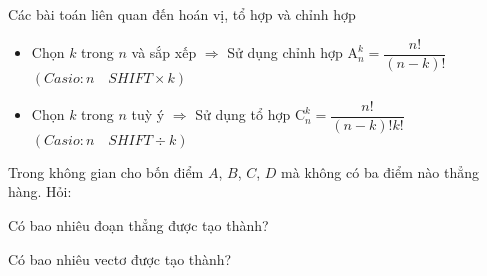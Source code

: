 \begin{dang}{Các bài toán liên quan đến hoán vị, tổ hợp và chỉnh hợp}
	\begin{itemize}
		\item Chọn $k$ trong $n$ và sắp xếp $\Rightarrow$ Sử dụng chỉnh hợp $\mathrm{A}_n^k=\dfrac{n!}{(n-k)!}$\\ $\left(Casio: n \quad SHIFT \times k\right)$
		\item Chọn $k$ trong $n$ tuỳ ý $\Rightarrow$ Sử dụng tổ hợp $\mathrm{C}_n^k=\dfrac{n!}{(n-k)!k!}$\\ $\left(Casio: n \quad SHIFT \div k\right)$
	\end{itemize}
\end{dang}
\begin{vd}%
	Trong không gian cho bốn điểm $A$, $B$, $C$, $D$ mà không có ba điểm nào thẳng hàng. Hỏi:
	\begin{listEX}[1] %
		\item Có bao nhiêu đoạn thẳng được tạo thành? 
		\item Có bao nhiêu vectơ được tạo thành? 
	\end{listEX}
\end{vd}
